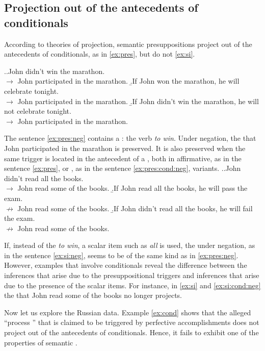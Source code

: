 \subsection{Projection out of the antecedents of conditionals}
According to theories of  projection, semantic presuppositions project out of the antecedents of conditionals, as in \ref{ex:pres}, but  do not \ref{ex:si}.

\ex.\a.\label{ex:pres:neg}John didn't win the marathon.\\
$\rightarrow$ John participated in the marathon.
\b.\label{ex:pres}If John won the marathon, he will celebrate tonight.\\
$\rightarrow$ John participated in the marathon.
\b.\label{ex:pres:cond:neg}If John didn't win the marathon, he will not celebrate tonight.\\
$\rightarrow$ John participated in the marathon.

The sentence \ref{ex:pres:neg} contains a : the verb \textit{to win}. Under negation, the  that John participated in the marathon is preserved. It is also preserved when the same trigger is located in the antecedent of a , both in affirmative, as in the sentence \ref{ex:pres}, or , as in the sentence \ref{ex:pres:cond:neg}, variants.
\ex.\a.\label{ex:si:neg}John didn't read all the books.\\
$\rightarrow$ John read some of the books.
\b.\label{ex:si}If John read all the books, he will pass the exam.\\
$\nrightarrow$ John read some of the books.
\b.\label{ex:si:cond:neg}If John didn't read all the books, he will fail the exam.\\
$\nrightarrow$ John read some of the books.

If, instead of the  \textit{to win}, a scalar item such as \textit{all} is used, the  under negation, as in the sentence \ref{ex:si:neg}, seems to be of the same kind as in \ref{ex:pres:neg}. However, examples that involve conditionals reveal the difference between the inferences that arise due to the presuppositional triggers and inferences that arise due to the presence of the scalar items. For instance, in \ref{ex:si} and \ref{ex:si:cond:neg} the  that John read some of the books no longer projects.

Now let us explore the Russian data. Example \ref{ex:cond} shows that the alleged ``process '' that is claimed to be triggered by perfective accomplishments does not project out of the antecedents of conditionals. Hence, it fails to exhibit one of the properties of semantic .

